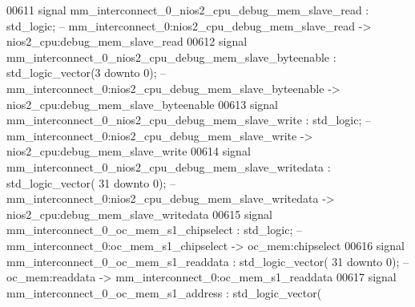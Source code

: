 \begin{DoxyCode}
00611     \textcolor{keywordflow}{signal} \textcolor{vhdlchar}{mm_interconnect_0_nios2_cpu_debug_mem_slave_read}                            \textcolor{vhdlchar}{:} \textcolor{comment}{std\_logic};\textcolor{keyword}{        
                   -- mm\_interconnect\_0:nios2\_cpu\_debug\_mem\_slave\_read -> nios2\_cpu:debug\_mem\_slave\_read}
00612     \textcolor{keywordflow}{signal} \textcolor{vhdlchar}{mm_interconnect_0_nios2_cpu_debug_mem_slave_byteenable}                      \textcolor{vhdlchar}{:} \textcolor{comment}{std\_logic\_vector}\textcolor{vhdlchar}{(}\textcolor{vhdllogic}{}\textcolor{vhdllogic}{3}
       \textcolor{keywordflow}{downto} \textcolor{vhdllogic}{}\textcolor{vhdllogic}{0}\textcolor{vhdlchar}{)};\textcolor{keyword}{  -- mm\_interconnect\_0:nios2\_cpu\_debug\_mem\_slave\_byteenable ->
       nios2\_cpu:debug\_mem\_slave\_byteenable}
00613     \textcolor{keywordflow}{signal} \textcolor{vhdlchar}{mm_interconnect_0_nios2_cpu_debug_mem_slave_write}                           \textcolor{vhdlchar}{:} \textcolor{comment}{std\_logic};\textcolor{keyword}{        
                   -- mm\_interconnect\_0:nios2\_cpu\_debug\_mem\_slave\_write -> nios2\_cpu:debug\_mem\_slave\_write}
00614     \textcolor{keywordflow}{signal} \textcolor{vhdlchar}{mm_interconnect_0_nios2_cpu_debug_mem_slave_writedata}                       \textcolor{vhdlchar}{:} \textcolor{comment}{std\_logic\_vector}\textcolor{vhdlchar}{(}\textcolor{vhdllogic}{}\textcolor{vhdllogic}{
      31} \textcolor{keywordflow}{downto} \textcolor{vhdllogic}{}\textcolor{vhdllogic}{0}\textcolor{vhdlchar}{)};\textcolor{keyword}{ -- mm\_interconnect\_0:nios2\_cpu\_debug\_mem\_slave\_writedata -> nios2\_cpu:debug\_mem\_slave\_writedata}
00615     \textcolor{keywordflow}{signal} \textcolor{vhdlchar}{mm_interconnect_0_oc_mem_s1_chipselect}                                      \textcolor{vhdlchar}{:} \textcolor{comment}{std\_logic};\textcolor{keyword}{        
                   -- mm\_interconnect\_0:oc\_mem\_s1\_chipselect -> oc\_mem:chipselect}
00616     \textcolor{keywordflow}{signal} \textcolor{vhdlchar}{mm_interconnect_0_oc_mem_s1_readdata}                                        \textcolor{vhdlchar}{:} \textcolor{comment}{std\_logic\_vector}\textcolor{vhdlchar}{(}\textcolor{vhdllogic}{}\textcolor{vhdllogic}{
      31} \textcolor{keywordflow}{downto} \textcolor{vhdllogic}{}\textcolor{vhdllogic}{0}\textcolor{vhdlchar}{)};\textcolor{keyword}{ -- oc\_mem:readdata -> mm\_interconnect\_0:oc\_mem\_s1\_readdata}
00617     \textcolor{keywordflow}{signal} \textcolor{vhdlchar}{mm_interconnect_0_oc_mem_s1_address}                                         \textcolor{vhdlchar}{:} \textcolor{comment}{std\_logic\_vector}\textcolor{vhdlchar}{(}\textcolor{vhdllogic}{}\textcolor{vhdllogic}{
}
\end{DoxyCode}
